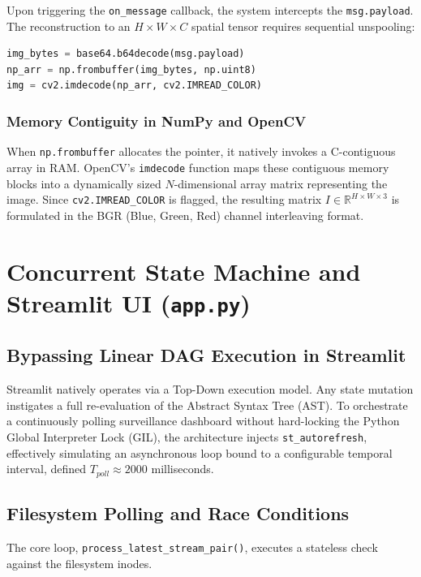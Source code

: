 \documentclass[11pt, letterpaper, oneside, openany]{book}
\begin{document}
Upon triggering the \texttt{on\_message} callback, the system intercepts the \texttt{msg.payload}. The reconstruction to an $H \times W \times C$ spatial tensor requires sequential unspooling:
\begin{lstlisting}[language=Python, caption=Buffer Instantiation and Memory Allocation]
img_bytes = base64.b64decode(msg.payload)
np_arr = np.frombuffer(img_bytes, np.uint8)
img = cv2.imdecode(np_arr, cv2.IMREAD_COLOR)
\end{lstlisting}

\subsection{Memory Contiguity in NumPy and OpenCV}
When \texttt{np.frombuffer} allocates the pointer, it natively invokes a C-contiguous array in RAM. OpenCV's \texttt{imdecode} function maps these contiguous memory blocks into a dynamically sized $N$-dimensional array matrix representing the image. Since \texttt{cv2.IMREAD\_COLOR} is flagged, the resulting matrix $I \in \mathbb{R}^{H \times W \times 3}$ is formulated in the BGR (Blue, Green, Red) channel interleaving format.

\chapter{Concurrent State Machine and Streamlit UI (\texttt{app.py})}

\section{Bypassing Linear DAG Execution in Streamlit}
Streamlit natively operates via a Top-Down execution model. Any state mutation instigates a full re-evaluation of the Abstract Syntax Tree (AST). To orchestrate a continuously polling surveillance dashboard without hard-locking the Python Global Interpreter Lock (GIL), the architecture injects \texttt{st\_autorefresh}, effectively simulating an asynchronous loop bound to a configurable temporal interval, defined $T_{poll} \approx 2000$ milliseconds.

\section{Filesystem Polling and Race Conditions}
The core loop, \texttt{process\_latest\_stream\_pair()}, executes a stateless check against the filesystem inodes. 
\end{document}
